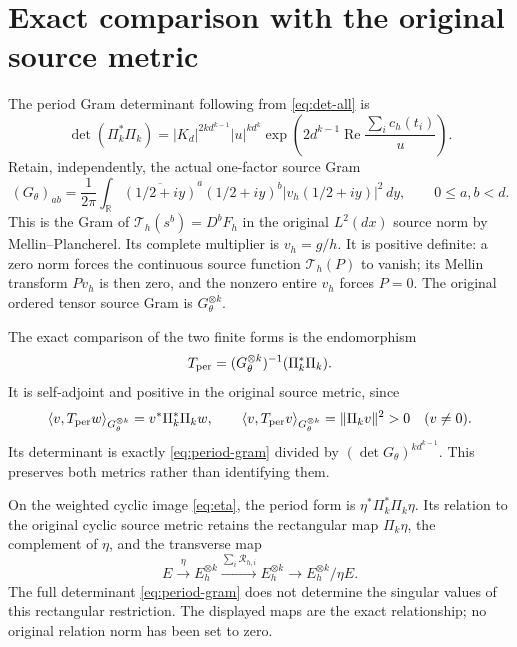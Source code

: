 \section{Exact comparison with the original source metric}

The period Gram determinant following from \eqref{eq:det-all} is
\begin{equation}
 \det(\Pi_k^*\Pi_k)=|K_d|^{2k d^{k-1}}|u|^{k d^k}
    \exp\!\left(2d^{k-1}\operatorname{Re}
                    \frac{\sum_i c_h(t_i)}u\right).
 \label{eq:period-gram}
\end{equation}
Retain, independently, the actual one-factor source Gram
\begin{equation}
 (G_\theta)_{ab}=\frac1{2\pi}\int_{\mathbb R}
     \overline{(1/2+iy)}^{a}(1/2+iy)^b
       |v_h(1/2+iy)|^2\,dy,\qquad 0\le a,b<d.
 \label{eq:theta-gram}
\end{equation}
This is the Gram of $\mathcal T_h(s^b)=D^bF_h$ in the original
$L^2(dx)$ source norm by Mellin--Plancherel.  Its complete multiplier is
$v_h=g/h$.  It is positive definite: a zero norm forces the continuous
source function $\mathcal T_h(P)$ to vanish; its Mellin transform
$Pv_h$ is then zero, and the nonzero entire $v_h$ forces $P=0$.
The original ordered tensor source Gram is $G_\theta^{\otimes k}$.

The exact comparison of the two finite forms is the endomorphism
\begin{equation}
 T_{\rm per}=(G_\theta^{\otimes k})^{-1}(\Pi_k^*\Pi_k).
 \label{eq:metric-map}
\end{equation}
It is self-adjoint and positive in the original source metric, since
\[
 \langle v,T_{\rm per}w\rangle_{G_\theta^{\otimes k}}
     =v^*\Pi_k^*\Pi_k w,
 \qquad
 \langle v,T_{\rm per}v\rangle_{G_\theta^{\otimes k}}
     =\|\Pi_kv\|^2>0\quad(v\ne0).
\]
Its determinant is exactly \eqref{eq:period-gram} divided by
$(\det G_\theta)^{k d^{k-1}}$.  This preserves both metrics rather
than identifying them.

On the weighted cyclic image \eqref{eq:eta}, the period form is
$\eta^*\Pi_k^*\Pi_k\eta$.  Its relation to the original cyclic
source metric retains the rectangular map $\Pi_k\eta$, the complement
of $\eta$, and the transverse map
\[
 E\xrightarrow{\eta}E_h^{\otimes k}
 \xrightarrow{\sum_i\mathcal R_{h,i}}E_h^{\otimes k}
 \longrightarrow E_h^{\otimes k}/\eta E.
\]
The full determinant \eqref{eq:period-gram} does not determine the
singular values of this rectangular restriction.  The displayed maps
are the exact relationship; no original relation norm has been set to
zero.

